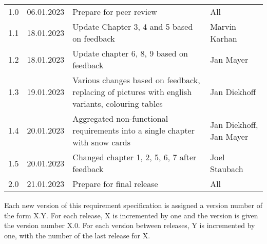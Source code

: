 \begin{footnotesize}
\begin{longtable}[L L L L]{ p{} p{} p{} p{} }
    \rowcolor{Gray}
    1.0              & 06.01.2023    & Prepare for peer review                                                                                                                       & All             \\
    
    1.1              & 18.01.2023    & Update Chapter 3, 4 and 5 based on feedback                                                                                                   & Marvin Karhan   \\

    \rowcolor{Gray}
    1.2              & 18.01.2023    & Update chapter 6, 8, 9 based on feedback                                                                             & Jan Mayer    \\

    1.3              & 19.01.2023    & Various changes based on feedback, replacing of pictures with english variants, colouring tables                                              & Jan Diekhoff    \\
    
    \rowcolor{Gray}
    1.4              & 20.01.2023    & Aggregated non-functional requirements into a single chapter with snow cards                                                                  & Jan Diekhoff, Jan Mayer    \\
    
    1.5              & 20.01.2023    &  Changed chapter 1, 2, 5, 6, 7 after feedback                                                                 & Joel Staubach   \\
    
    \rowcolor{Gray}
    2.0              & 21.01.2023    &  Prepare for final release                                                                 & All   \\
    \bottomrule
  \end{longtable}
\end{footnotesize}
\rmfamily

Each new version of this requirement specification is assigned a version number of the form X.Y. For each release, X is incremented by one and the version is given the version number X.0. For each version between releases, Y is incremented by one, with the number of the last release for X.

